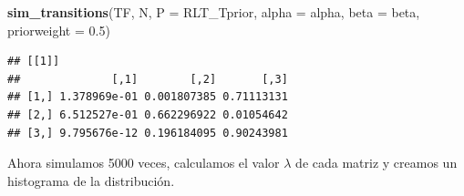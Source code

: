 \documentclass[
]{book}
\newenvironment{Shaded}{\begin{snugshade}}{\end{snugshade}}
\newcommand{\AttributeTok}[1]{\textcolor[rgb]{0.13,0.29,0.53}{#1}}
\newcommand{\FloatTok}[1]{\textcolor[rgb]{0.00,0.00,0.81}{#1}}
\newcommand{\FunctionTok}[1]{\textcolor[rgb]{0.13,0.29,0.53}{\textbf{#1}}}
\newcommand{\NormalTok}[1]{#1}
\theoremstyle{definition}
\theoremstyle{definition}
\theoremstyle{definition}
\theoremstyle{definition}
\theoremstyle{remark}
\begin{document}
\begin{Shaded}
\begin{Highlighting}[]
\FunctionTok{sim\_transitions}\NormalTok{(TF, N, }\AttributeTok{P =}\NormalTok{ RLT\_Tprior, }\AttributeTok{alpha =}\NormalTok{ alpha, }\AttributeTok{beta =}\NormalTok{ beta,}
                \AttributeTok{priorweight =} \FloatTok{0.5}\NormalTok{)}
\end{Highlighting}
\end{Shaded}

\begin{verbatim}
## [[1]]
##              [,1]        [,2]       [,3]
## [1,] 1.378969e-01 0.001807385 0.71113131
## [2,] 6.512527e-01 0.662296922 0.01054642
## [3,] 9.795676e-12 0.196184095 0.90243981
\end{verbatim}

Ahora simulamos 5000 veces, calculamos el valor \(\lambda\) de cada
matriz y creamos un histograma de la distribución.
\end{document}
